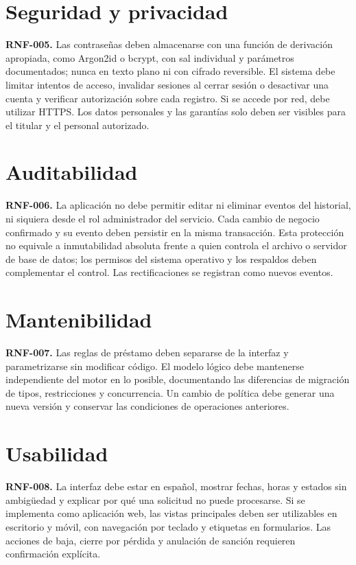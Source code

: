 \section{Seguridad y privacidad}
\textbf{RNF-005.} Las contrase\~nas deben almacenarse con una funci\'on de derivaci\'on apropiada, como Argon2id o bcrypt, con sal individual y par\'ametros documentados; nunca en texto plano ni con cifrado reversible. El sistema debe limitar intentos de acceso, invalidar sesiones al cerrar sesi\'on o desactivar una cuenta y verificar autorizaci\'on sobre cada registro. Si se accede por red, debe utilizar HTTPS. Los datos personales y las garant\'ias solo deben ser visibles para el titular y el personal autorizado.

\section{Auditabilidad}
\textbf{RNF-006.} La aplicaci\'on no debe permitir editar ni eliminar eventos del historial, ni siquiera desde el rol administrador del servicio. Cada cambio de negocio confirmado y su evento deben persistir en la misma transacci\'on. Esta protecci\'on no equivale a inmutabilidad absoluta frente a quien controla el archivo o servidor de base de datos; los permisos del sistema operativo y los respaldos deben complementar el control. Las rectificaciones se registran como nuevos eventos.

\section{Mantenibilidad}
\textbf{RNF-007.} Las reglas de pr\'estamo deben separarse de la interfaz y parametrizarse sin modificar c\'odigo. El modelo l\'ogico debe mantenerse independiente del motor en lo posible, documentando las diferencias de migraci\'on de tipos, restricciones y concurrencia. Un cambio de pol\'itica debe generar una nueva versi\'on y conservar las condiciones de operaciones anteriores.

\section{Usabilidad}
\textbf{RNF-008.} La interfaz debe estar en espa\~nol, mostrar fechas, horas y estados sin ambig\"uedad y explicar por qu\'e una solicitud no puede procesarse. Si se implementa como aplicaci\'on web, las vistas principales deben ser utilizables en escritorio y m\'ovil, con navegaci\'on por teclado y etiquetas en formularios. Las acciones de baja, cierre por p\'erdida y anulaci\'on de sanci\'on requieren confirmaci\'on expl\'icita.

